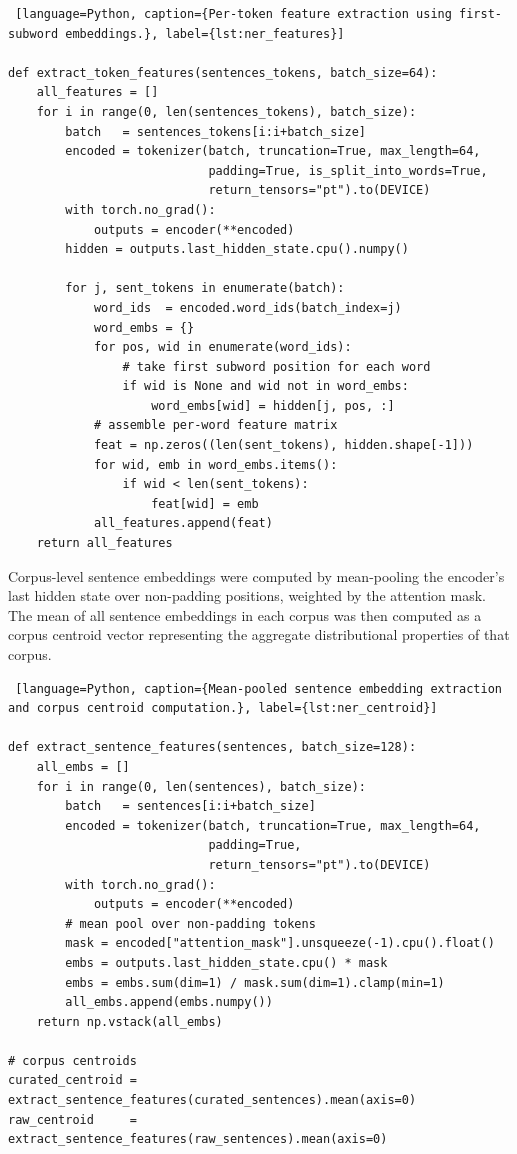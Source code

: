 \documentclass[12pt]{ThesisRU}
\begin{document}
\begin{lstlisting} [language=Python, caption={Per-token feature extraction using first-subword embeddings.}, label={lst:ner_features}]

def extract_token_features(sentences_tokens, batch_size=64):
    all_features = []
    for i in range(0, len(sentences_tokens), batch_size):
        batch   = sentences_tokens[i:i+batch_size]
        encoded = tokenizer(batch, truncation=True, max_length=64,
                            padding=True, is_split_into_words=True,
                            return_tensors="pt").to(DEVICE)
        with torch.no_grad():
            outputs = encoder(**encoded)
        hidden = outputs.last_hidden_state.cpu().numpy()
 
        for j, sent_tokens in enumerate(batch):
            word_ids  = encoded.word_ids(batch_index=j)
            word_embs = {}
            for pos, wid in enumerate(word_ids):
                # take first subword position for each word
                if wid is None and wid not in word_embs:
                    word_embs[wid] = hidden[j, pos, :]
            # assemble per-word feature matrix
            feat = np.zeros((len(sent_tokens), hidden.shape[-1]))
            for wid, emb in word_embs.items():
                if wid < len(sent_tokens):
                    feat[wid] = emb
            all_features.append(feat)
    return all_features

\end{lstlisting}

Corpus-level sentence embeddings were computed by mean-pooling the encoder's last hidden state over non-padding positions, weighted by the attention mask. The mean of all sentence embeddings in each corpus was then computed as a corpus centroid vector representing the aggregate distributional properties of that corpus.

\begin{lstlisting} [language=Python, caption={Mean-pooled sentence embedding extraction and corpus centroid computation.}, label={lst:ner_centroid}]

def extract_sentence_features(sentences, batch_size=128):
    all_embs = []
    for i in range(0, len(sentences), batch_size):
        batch   = sentences[i:i+batch_size]
        encoded = tokenizer(batch, truncation=True, max_length=64,
                            padding=True,
                            return_tensors="pt").to(DEVICE)
        with torch.no_grad():
            outputs = encoder(**encoded)
        # mean pool over non-padding tokens
        mask = encoded["attention_mask"].unsqueeze(-1).cpu().float()
        embs = outputs.last_hidden_state.cpu() * mask
        embs = embs.sum(dim=1) / mask.sum(dim=1).clamp(min=1)
        all_embs.append(embs.numpy())
    return np.vstack(all_embs)
 
# corpus centroids
curated_centroid = extract_sentence_features(curated_sentences).mean(axis=0)
raw_centroid     = extract_sentence_features(raw_sentences).mean(axis=0)

\end{lstlisting}
\end{document}
